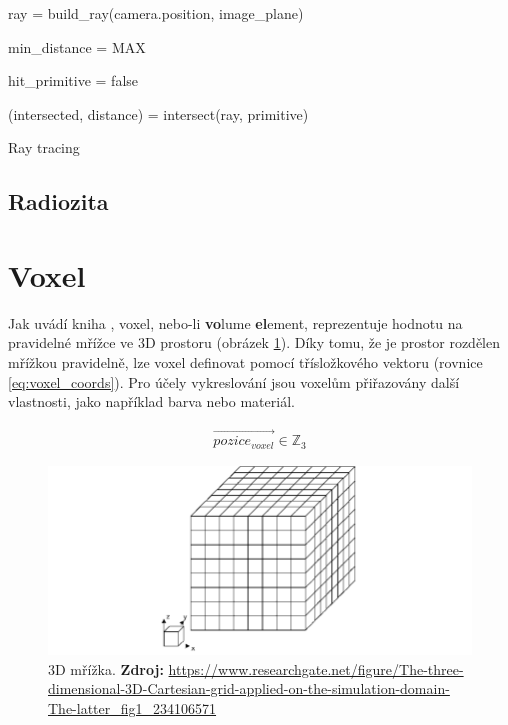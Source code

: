 \begin{center}
\begin{czechalgorithm}[H] \label{alg:rt_1}
    ray = build\_ray(camera.position, image\_plane)
    
    min\_distance = MAX
    
    hit\_primitive = false
    
     {
    
        (intersected, distance) = intersect(ray, primitive)
        
    }
 \caption{Ray tracing}
\end{czechalgorithm}
\end{center}


\subsection{Radiozita}

\section{Voxel}
Jak uvádí kniha \cite{gfx_principles_practice}, voxel, nebo-li \textbf{vo}lume \textbf{el}ement, reprezentuje hodnotu na pravidelné mřížce ve 3D prostoru (obrázek \ref{fig:3d_grid}). Díky tomu, že je prostor rozdělen mřížkou pravidelně, lze voxel definovat pomocí třísložkového vektoru (rovnice \ref{eq:voxel_coords}). Pro účely vykreslování jsou voxelům přiřazovány další vlastnosti, jako například barva nebo materiál.

\begin{equation} \label{eq:voxel_coords}
\begin{gathered}
\vec{pozice_{voxel}} \in \mathbb{Z}_3
\end{gathered}
\end{equation}

\begin{figure}[H]
    \centering
    \includegraphics[scale=0.5]{obrazky-figures/3d_grid.png}
    \caption{3D mřížka. \textbf{Zdroj: }\url{https://www.researchgate.net/figure/The-three-dimensional-3D-Cartesian-grid-applied-on-the-simulation-domain-The-latter_fig1_234106571}}
    \label{fig:3d_grid}
\end{figure}

